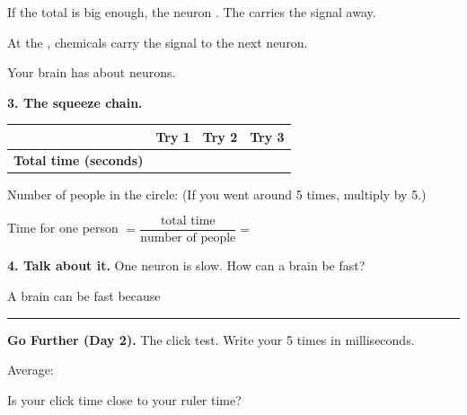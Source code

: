 \documentclass[11pt]{article}
\begin{document}
\vspace{0.8em}
If the total is big enough, the neuron . The  carries the signal away.

\vspace{0.8em}
At the , chemicals carry the signal to the next neuron.

\vspace{0.8em}
Your brain has about  neurons.

\newpage

{\large\textbf{3. The squeeze chain.}}

\vspace{0.3em}
\begin{tabular}{|R{1.9in}|c|c|c|}
\hline
 & \textbf{Try 1} & \textbf{Try 2} & \textbf{Try 3} \\ \hline
\textbf{Total time (seconds)} & \hspace{0.3in} & \hspace{1.1in} & \hspace{1.1in} \\ \hline
\end{tabular}

\vspace{0.7em}
Number of people in the circle: \blank{0.7in} \quad (If you went around 5 times, multiply by 5.)

\vspace{0.8em}
Time for one person $= \dfrac{\text{total time}}{\text{number of people}} =$ 

\vspace{1.1em}
{\large\textbf{4. Talk about it.}} One neuron is slow. How can a brain be fast?

\vspace{0.6em}
A brain can be fast because 

\vspace{0.9em}
\blank{6.9in}

\vspace{0.9em}
\blank{6.9in}

\vspace{1.4em}
\hrule
\vspace{0.8em}
{\large\textbf{Go Further (Day 2).}} The click test. Write your 5 times in milliseconds.

\vspace{0.4em}
\blank{0.8in}\quad \blank{0.8in}\quad \blank{0.8in}\quad \blank{0.8in}\quad \blank{0.8in} \qquad Average: \blank{0.9in}

\vspace{0.8em}
Is your click time close to your ruler time? 

\vspace{1.1em}
\end{document}
